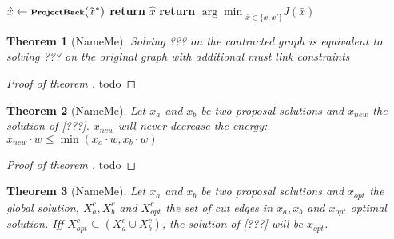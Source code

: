 \documentclass[10pt,twocolumn,letterpaper]{article}
\newtheorem{theorem}{Theorem}
\begin{document}
\begin{algorithm}
\begin{scriptsize}
\begin{algorithmic}[1]
\State $\hat{x} \gets \textbf{\scriptsize{ProjectBack}}(\tilde{x}^*)$
\State \textbf{return} $\hat{x}$
\EndProcedure
\vspace{0.3cm}
\State \textbf{return} ${\arg\min}_{\bar{x} \in \{x,x'\}}J(\bar{x})$
\EndProcedure
\end{algorithmic}
\end{scriptsize}
\end{algorithm}






\begin{theorem}[NameMe]
Solving ??? on the contracted graph is 
equivalent to solving ??? on the 
original graph with additional 
must link constraints
\end{theorem}

\begin{proof}[Proof of theorem ]
todo
\end{proof}



\begin{theorem}[NameMe]
Let $x_{a}$ and $x_{b}$ be two proposal solutions and  $x_{new}$ the solution of \ref{???}.
$x_{new}$  will never decrease the energy:
$x_{new} \cdot w \leq  \min( x_{a}\cdot w,  x_{b}\cdot w) $ 
\end{theorem}

\begin{proof}[Proof of theorem ]
todo
\end{proof}



\begin{theorem}[NameMe]

Let $x_{a}$ and $x_{b}$ be two proposal solutions and  $x_{opt}$ the global solution,
$X_{a}^c, X_{b}^c$ and $ X_{opt}^c$ the set of cut edges in  $x_{a}, x_{b}$  and $ x_{opt}$
optimal solution.
Iff  $ X_{opt}^c \subseteq  (X_{a}^c \cup X_{b}^c)$,  the solution of \ref{???} will be $x_{opt}$.
\end{theorem}
\end{document}
